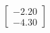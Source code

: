 \documentclass[preview]{standalone}
\begin{document}
\begin{align*}
\begin{bmatrix} -2.20 \\ -4.30 \end{bmatrix}
\end{align*}
\end{document}
